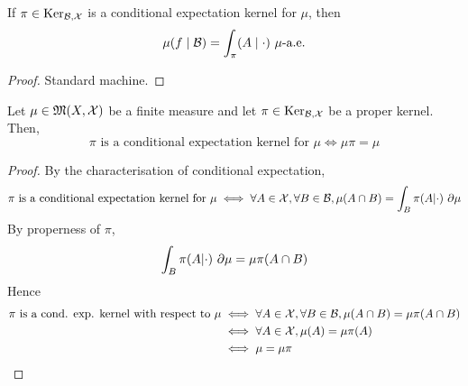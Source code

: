 \begin{lemma}
    \label{lem:cond-exp-ker-proper-tfae}

    If $\pi \in \text{Ker}_{\mathcal B, \mathcal X}$ is a conditional expectation kernel for $\mu$, then
    $$\mu(f\mid \mathcal B) = \int_\pi(A\mid\cdot)\ \mu\text{-a.e.}$$
\end{lemma}
\begin{proof}

    Standard machine.
\end{proof}

\begin{lemma}
    \label{lem:cond-exp-ker-char}

    Let $\mu\in\mathfrak{M}(X,\mathcal X)$ be a finite measure and let $\pi\in\text{Ker}_{\mathcal B,\mathcal X}$ be a proper kernel. Then,
    $$\pi \text{ is a conditional expectation kernel for }\mu \iff \mu\pi = \mu$$
\end{lemma}
\begin{proof}
    \leanok

    By the characterisation of conditional expectation,
    $$\pi \text{ is a conditional expectation kernel for }\mu \iff \forall A \in \mathcal X, \forall B \in \mathcal B, \mu(A \cap B) = \int_B \pi(A|\cdot)\ \partial\mu$$
    By properness of $\pi$,
    $$\int_B \pi(A|\cdot)\ \partial\mu = \mu\pi(A \cap B)$$
    Hence
    \begin{align}
        \pi \text{ is a cond. exp. kernel with respect to }\mu
        & \iff \forall A \in \mathcal X, \forall B \in \mathcal B, \mu(A \cap B) = \mu\pi(A \cap B) \\
        & \iff \forall A \in \mathcal X, \mu(A) = \mu\pi(A) \\
        & \iff \mu = \mu\pi
    \end{align}
\end{proof}
